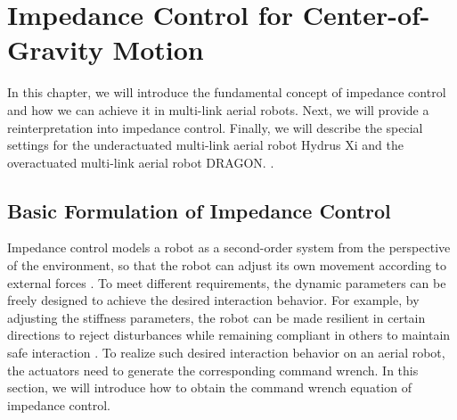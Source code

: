 \chapter{Impedance Control for Center-of-Gravity Motion}
\label{ch:impedance}

In this chapter, we will introduce the fundamental concept of impedance control and how we can achieve it in multi-link aerial robots. Next, we will provide a reinterpretation into impedance control. Finally, we will describe the special settings for the underactuated multi-link aerial robot Hydrus Xi and the overactuated multi-link aerial robot DRAGON.
.




\section{Basic Formulation of Impedance Control}

Impedance control models a robot as a second-order system from the perspective of the environment, so that the robot can adjust its own movement according to external forces \cite{hogan_1984_impedance}. To meet different requirements, the dynamic parameters can be freely designed to achieve the desired interaction behavior. For example, by adjusting the stiffness parameters, the robot can be made resilient in certain directions to reject disturbances while remaining compliant in others to maintain safe interaction \cite{bodie_2020_active}. To realize such desired interaction behavior on an aerial robot, the actuators need to generate the corresponding command wrench. In this section, we will introduce how to obtain the command wrench equation of impedance control.

